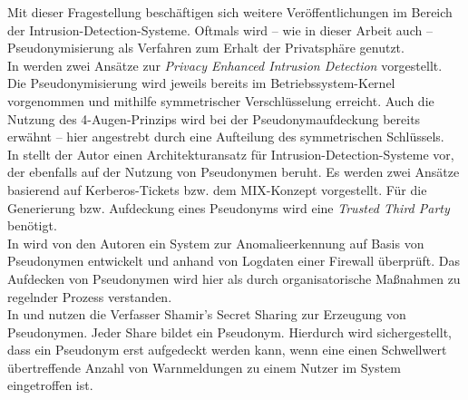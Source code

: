 
Mit dieser Fragestellung beschäftigen sich weitere Veröffentlichungen im Bereich der Intrusion-Detection-Systeme. Oftmals wird -- wie in dieser Arbeit auch -- Pseudonymisierung als Verfahren zum Erhalt der Privatsphäre genutzt.\\
In \cite{sobirey1997pseudonymous} werden zwei Ansätze zur \textit{Privacy Enhanced Intrusion Detection} vorgestellt. Die Pseudonymisierung wird jeweils bereits im Betriebssystem-Kernel vorgenommen und mithilfe symmetrischer Verschlüsselung erreicht. Auch die Nutzung des 4-Augen-Prinzips wird bei der Pseudonymaufdeckung bereits erwähnt -- hier angestrebt durch eine Aufteilung des symmetrischen Schlüssels.\\
In \cite{buschkes1999privacy} stellt der Autor einen Architekturansatz für Intrusion-Detection-Systeme vor, der ebenfalls auf der Nutzung von Pseudonymen beruht. Es werden zwei Ansätze basierend auf Kerberos-Tickets bzw. dem MIX-Konzept vorgestellt. Für die Generierung bzw. Aufdeckung eines Pseudonyms wird eine \textit{Trusted Third Party} benötigt.\\
In \cite{lundin2000anomaly} wird von den Autoren ein System zur Anomalieerkennung auf Basis von Pseudonymen entwickelt und anhand von Logdaten einer Firewall überprüft. Das Aufdecken von Pseudonymen wird hier als durch organisatorische Maßnahmen zu regelnder Prozess verstanden.\\
In \cite{biskup2000threshold} und \cite{biskup2001pseudonymization} nutzen die Verfasser Shamir's Secret Sharing zur Erzeugung von Pseudonymen. Jeder Share bildet ein Pseudonym. Hierdurch wird sichergestellt, dass ein Pseudonym erst aufgedeckt werden kann, wenn eine einen Schwellwert übertreffende Anzahl von Warnmeldungen zu einem Nutzer im System eingetroffen ist.





